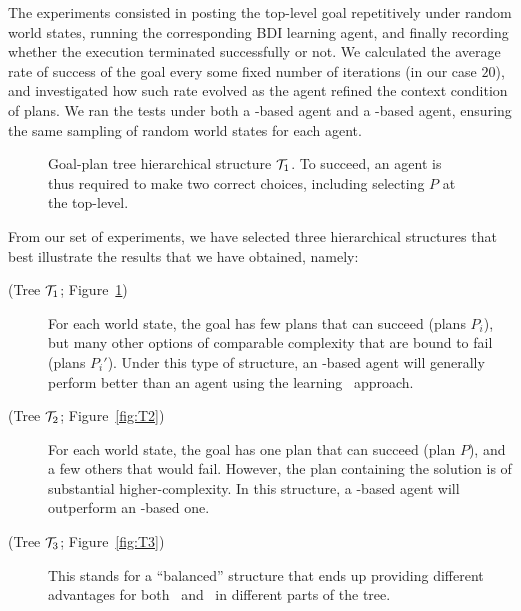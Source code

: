 The experiments consisted in posting the top-level goal repetitively under random
world states, running the corresponding  BDI learning agent, and finally
recording whether the execution terminated successfully or not.
We calculated the average rate of success of the goal every some fixed
number of iterations (in our case $20$), and investigated how such rate evolved
as the agent refined the context condition of plans.
We ran the tests under both a \BUL-based agent and a \CL-based agent,
ensuring the same sampling of random world states for each agent.

\begin{figure}[t]
\begin{center}

\end{center}
\caption{Goal-plan tree hierarchical structure ${\mathcal{T}}_1$. To succeed, an agent is thus required to make
two correct choices, including selecting $P$ at the top-level.}
\label{fig:T1}
\end{figure}


From our set of experiments, we have selected three hierarchical structures that
best illustrate the results that we have obtained, namely:
\begin{description}
\item[(Tree ${\mathcal{T}}_1$; Figure~\ref{fig:T1})] For each world state, the goal has
few plans that can succeed (plans $P_i$), but many other options of comparable
complexity that are bound to fail (plans $P_i'$). 
Under this type of structure, an \CL-based agent will generally perform better 
than an agent using the learning \BUL\ approach.

\item[(Tree ${\mathcal{T}}_2$; Figure~\ref{fig:T2})] For each world state, the goal has
one plan that can succeed (plan $P$), and a few others that would fail.
However, the plan containing the solution is of substantial higher-complexity. 
In this structure, a \BUL-based agent will outperform an \CL-based one.

\item[(Tree ${\mathcal{T}}_3$; Figure~\ref{fig:T3})] This stands for a ``balanced''
structure that ends up providing different advantages for both \BUL\ and \CL\ in
different parts of the tree.
\end{description}


